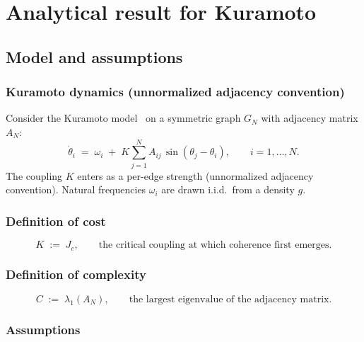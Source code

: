 \section{Analytical result for Kuramoto}
\label{sec:lemma1}

\subsection{Model and assumptions}
\label{sec:lemma1-model}

\subsubsection{Kuramoto dynamics (unnormalized adjacency convention)}

Consider the Kuramoto model~\cite{kuramoto1975} on a symmetric graph $G_N$ with adjacency matrix $A_N$:
\begin{equation}
\dot\theta_i \;=\; \omega_i \;+\; K \sum_{j=1}^{N} A_{ij}\,\sin(\theta_j - \theta_i),
\qquad i = 1, \dots, N.
\label{eq:kuramoto-unnormalized}
\end{equation}
The coupling $K$ enters as a per-edge strength (unnormalized adjacency convention). Natural frequencies $\omega_i$ are drawn i.i.d.\ from a density $g$.

\subsubsection{Definition of cost}

\begin{equation}
K \;:=\; J_c,
\qquad\text{the critical coupling at which coherence first emerges.}
\label{eq:cost-def}
\end{equation}

\subsubsection{Definition of complexity}

\begin{equation}
C \;:=\; \lambda_1(A_N),
\qquad\text{the largest eigenvalue of the adjacency matrix.}
\label{eq:complexity-def}
\end{equation}

\subsubsection{Assumptions}

